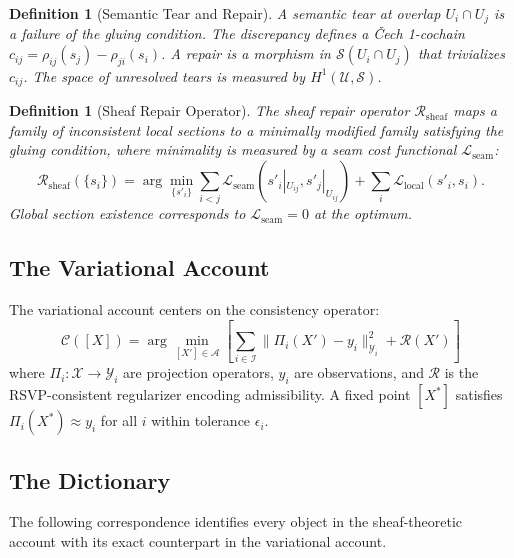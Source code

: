 \documentclass[12pt, oneside]{article}
\newtheorem{definition}[theorem]{Definition}
\begin{document}
\begin{definition}[Semantic Tear and Repair]
A \emph{semantic tear} at overlap $U_i \cap U_j$ is a failure of the gluing condition.
The discrepancy defines a \v{C}ech 1-cochain
$c_{ij} = \rho_{ij}(s_j) - \rho_{ji}(s_i)$. A \emph{repair} is a morphism in
$\mathcal{S}(U_i \cap U_j)$ that trivializes $c_{ij}$. The space of unresolved tears is
measured by $H^1(\mathcal{U}, \mathcal{S})$.
\end{definition}

\begin{definition}[Sheaf Repair Operator]
The \emph{sheaf repair operator} $\mathcal{R}_{\mathrm{sheaf}}$ maps a family of
inconsistent local sections to a minimally modified family satisfying the gluing condition,
where minimality is measured by a seam cost functional $\mathcal{L}_{\mathrm{seam}}$:
\[
\mathcal{R}_{\mathrm{sheaf}}(\{s_i\}) = \arg\min_{\{s'_i\}} \sum_{i < j}
\mathcal{L}_{\mathrm{seam}}(s'_i|_{U_{ij}}, s'_j|_{U_{ij}}) +
\sum_i \mathcal{L}_{\mathrm{local}}(s'_i, s_i).
\]
Global section existence corresponds to $\mathcal{L}_{\mathrm{seam}} = 0$ at the optimum.
\end{definition}

\subsection{The Variational Account}

The variational account centers on the consistency operator:
\[
\mathcal{C}([X]) = \arg\min_{[X'] \in \mathcal{A}}
\left[ \sum_{i \in \mathcal{I}} \|\Pi_i(X') - y_i\|_{\mathcal{Y}_i}^2
+ \mathcal{R}(X') \right]
\]
where $\Pi_i : \mathcal{X} \to \mathcal{Y}_i$ are projection operators, $y_i$ are
observations, and $\mathcal{R}$ is the RSVP-consistent regularizer encoding admissibility.
A fixed point $[X^*]$ satisfies $\Pi_i(X^*) \approx y_i$ for all $i$ within tolerance
$\epsilon_i$.

\subsection{The Dictionary}

The following correspondence identifies every object in the sheaf-theoretic account with
its exact counterpart in the variational account.
\end{document}
